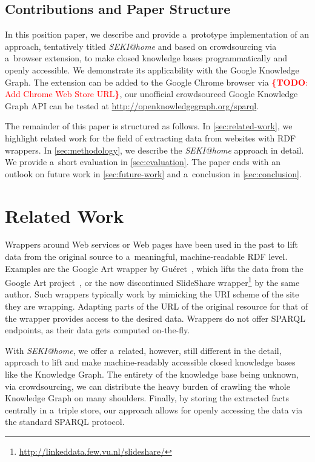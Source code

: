 \documentclass[runningheads,a4paper]{llncs}
\newcommand{\todo}[1]{\noindent\textcolor{red}{{\bf \{TODO}: #1{\bf \}}}}
\begin{document}
\subsection{Contributions and Paper Structure}
In this position paper, we describe and provide a~prototype implementation
of an approach, tentatively titled \emph{SEKI@home} and
based on crowdsourcing via a~browser extension,
to make closed knowledge bases programmatically and openly accessible.
We demonstrate its applicability with the Google Knowledge Graph.
The extension can be added to the Google Chrome browser via \todo{Add Chrome Web Store URL},
our unofficial crowdsourced Google Knowledge Graph API can be tested at
\url{http://openknowledgegraph.org/sparql}.

The remainder of this paper is structured as follows.
In \autoref{sec:related-work}, we highlight related work
for the field of extracting data from websites with RDF wrappers.
In \autoref{sec:methodology}, we describe the \emph{SEKI@home} approach in detail.
We provide a~short evaluation in \autoref{sec:evaluation}.
The paper ends with an outlook on future work in \autoref{sec:future-work}
and a~conclusion in \autoref{sec:conclusion}.

\section{Related Work} \label{sec:related-work}
Wrappers around Web services or Web pages have been used in the past
to lift data from the original source to a~meaningful, machine-readable RDF level.
Examples are the Google Art wrapper by Guéret~\cite{gueret2011},
which lifts the data from the Google Art project~\cite{sood2011},
or the now discontinued SlideShare wrapper\footnote{\url{http://linkeddata.few.vu.nl/slideshare/}} by the same author.
Such wrappers typically work by mimicking the URI scheme of the site they are wrapping.
Adapting parts of the URL of the original resource for that of the wrapper
provides access to the desired data.
Wrappers do not offer SPARQL endpoints, as their data gets computed on-the-fly.

With \emph{SEKI@home}, we offer a~related, however, still different in the detail,
approach to lift and make machine-readably accessible
closed knowledge bases like the Knowledge Graph.
The entirety of the knowledge base being unknown,
via crowdsourcing, we can distribute the heavy burden
of crawling the whole Knowledge Graph on many shoulders.
Finally, by storing the extracted facts centrally in a~triple store,
our approach allows for openly accessing the data via the standard SPARQL protocol.
\end{document}
